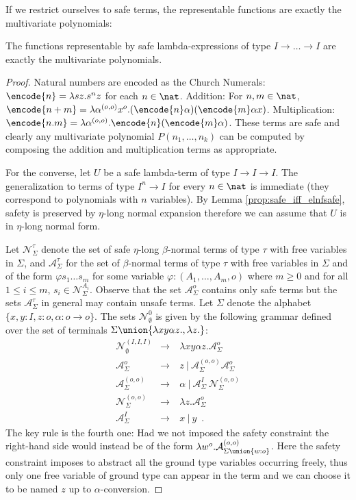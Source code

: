 If we restrict ourselves to safe terms, the representable functions
are exactly the multivariate polynomials:
\begin{theorem}
\label{thm:polychar} The functions representable by safe
lambda-expressions of type $I\rightarrow \ldots \rightarrow I$
are exactly the multivariate polynomials.
\end{theorem}
\begin{proof}
  Natural numbers are encoded as the Church Numerals: $\encode{n} =
  \lambda s z. s^n z$ for each $n \in\nat$.  Addition: For $n,m \in \nat$, $\encode{n+m} =
  \lambda \alpha^{(o,o)} x^o . (\encode{n} \alpha) (\encode{m} \alpha
  x)$. Multiplication: $\encode{n . m} = \lambda \alpha^{(o,o)}
  . \encode{n} (\encode{m} \alpha)$. These terms are safe and
  clearly any multivariate polynomial $P(n_1, \ldots, n_k)$ can be
  computed by composing the addition and multiplication terms as
  appropriate.

For the converse, let $U$ be a safe lambda-term of type
$I\rightarrow I\rightarrow I$.  The generalization to terms of type
$I^n \rightarrow I$ for every $n\in\nat$ is immediate (they correspond
to polynomials with $n$ variables). By Lemma
\ref{prop:safe_iff_elnfsafe}, safety is preserved by $\eta$-long
normal expansion therefore we can assume that $U$ is in $\eta$-long
normal form.


Let $\mathcal{N}^\tau_\Sigma$ denote the set of safe
$\eta$-long $\beta$-normal terms of type $\tau$ with free variables
in $\Sigma$, and $\mathcal{A}^\tau_\Sigma$ for the set of
$\beta$-normal terms of type $\tau$ with free variables in $\Sigma$
and of the form $\varphi s_1 \ldots s_m$ for some variable
$\varphi:(A_1,\ldots,A_m,o)$ where $m\geq0$ and for all $1\leq i
\leq m$, $s_i \in \mathcal{N}^{A_i}_\Sigma$. Observe that the set
$\mathcal{A}^o_\Sigma$ contains only safe terms but the sets
$\mathcal{A}^\tau_\Sigma$ in general may contain unsafe terms. Let
$\Sigma$ denote the alphabet $\{ x, y : I, z :o, \alpha :
o\rightarrow o \}$. The sets $\mathcal{N}^0_\emptyset$ is given by
the following grammar defined over the set of terminals $\Sigma
\union \{\lambda x y \alpha z. , \lambda z. \}$:
\begin{eqnarray*}
\mathcal{N}^{(I,I,I)}_\emptyset &\rightarrow& \ \lambda x y \alpha z . \mathcal{A}^o_\Sigma \\
\mathcal{A}^o_\Sigma &\rightarrow&\ z \ | \ \mathcal{A}^{(o,o)}_\Sigma \mathcal{A}^o_\Sigma \\
\mathcal{A}^{(o,o)}_\Sigma &\rightarrow&\ \alpha \ |\ \mathcal{A}^I_\Sigma ~\mathcal{N}^{(o,o)}_\Sigma \\
\mathcal{N}^{(o,o)}_\Sigma &\rightarrow& \ \lambda z . \mathcal{A}^{o}_\Sigma \\
\mathcal{A}^I_\Sigma &\rightarrow&\ x \ |\ y \enspace .
\end{eqnarray*}
The key rule is the fourth one: Had we not imposed the safety
constraint the right-hand side would instead be of the form $\lambda
w^o . \mathcal{A}^{(o,o)}_{\Sigma\union\{w:o\}}$. Here the safety
constraint imposes to abstract all the ground type variables
occurring freely, thus only one free variable of ground type can
appear in the term and we can choose it to be named $z$ up to
$\alpha$-conversion.


\end{proof}
